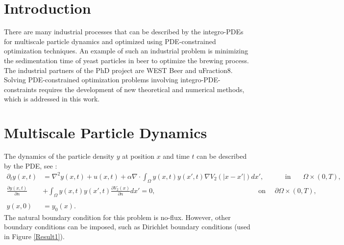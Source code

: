 \documentclass[a0,portrait]{a0poster}
\newcommand{\Sta}{y}
\begin{document}
\vspace{-1cm} %


\begin{multicols}{2} %







\section*{Introduction}
There are many industrial processes that can be described by the integro-PDEs for multiscale particle dynamics and optimized using PDE-constrained optimization techniques. An example of such an industrial problem is minimizing the sedimentation time of yeast particles in beer to optimize the brewing process. The industrial partners of the PhD project are WEST Beer and uFraction8. Solving PDE-constrained optimization problems involving integro-PDE-constraints requires the development of new theoretical and numerical methods, which is addressed in this work. 

\section*{Multiscale Particle Dynamics}
The dynamics of the particle density $\Sta$ at position $x$ and time $t$ can be described by the PDE, see \cite{RexLoewen1}:
\begin{align*}
\partial_t \Sta(x,t) &=\nabla^2 \Sta(x,t) +u (x,t)+\alpha \nabla \cdot\int_\Omega \Sta(x,t) \Sta(x',t) \nabla V_2(|x-x'|)dx',\qquad \ \ \ \ \ \text{in   } \ \ \quad \Omega \times (0,T),\\
\frac{\partial \Sta(x,t)}{\partial n} &+\int_\Omega \Sta(x,t) \Sta(x',t) \frac{\partial V_2(x)}{\partial n}dx'=0, \quad \qquad\qquad\qquad\qquad\qquad\qquad\qquad  \text{on   } \quad \partial \Omega \times (0,T),\\
\\
\Sta(x,0) &=\Sta_0(x).
\end{align*}
 The natural boundary condition for this problem is no-flux. However, other boundary conditions can be imposed, such as Dirichlet boundary conditions (used in Figure \ref{Result1}).


\end{multicols}
\end{document}
